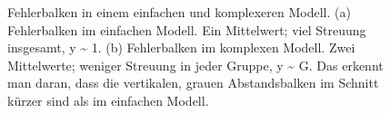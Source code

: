 \documentclass[
  letterpaper,
  twoside,
  open=any]{scrbook}
\theoremstyle{definition}
\theoremstyle{definition}
\theoremstyle{definition}
\theoremstyle{remark}
\begin{document}
\begin{figure}

\begin{minipage}{0.50\linewidth}



\end{minipage}%
%
\begin{minipage}{0.50\linewidth}



\end{minipage}%

\caption{\label{fig-fehler-red}Fehlerbalken in einem einfachen und
komplexeren Modell. (a) Fehlerbalken im einfachen Modell. Ein
Mittelwert; viel Streuung insgesamt, y \textasciitilde{} 1. (b)
Fehlerbalken im komplexen Modell. Zwei Mittelwerte; weniger Streuung in
jeder Gruppe, y \textasciitilde{} G. Das erkennt man daran, dass die
vertikalen, grauen Abstandsbalken im Schnitt kürzer sind als im
einfachen Modell.}

\end{figure}%
\end{document}
